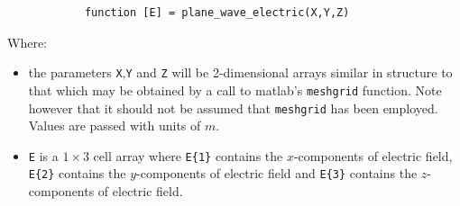\documentclass[a4paper, 12pt]{article}
\begin{document}
\begin{itemize}
		\begin{verbatim}
			function [E] = plane_wave_electric(X,Y,Z)
		\end{verbatim}
		
		Where:
		\begin{itemize}
			\item the parameters \verb+X+,\verb+Y+ and \verb+Z+ will be
			2-dimensional arrays similar in structure to that which  may be
			obtained by a call to matlab's \verb+meshgrid+ function. Note
			however that it should not be assumed that \verb+meshgrid+ has been
			employed. Values are passed with units of $ m$.
			\item \verb+E+ is a $1\times3$ cell array where \verb+E{1}+ contains
			the $x$-components of electric field, \verb+E{2}+ contains
			the $y$-components of electric field and \verb+E{3}+ contains
			the $z$-components of electric field. 
			

\end{itemize}
\end{itemize}
\end{document}
